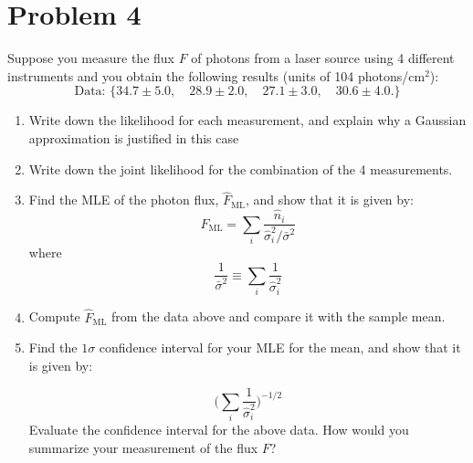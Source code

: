 \documentclass[11pt]{article}
\begin{document}
\section*{Problem 4}
Suppose you measure the flux $F$ of photons from a laser source using 4 different instruments and you obtain the following results (units of 104 photons/cm$^2$):
\begin{equation}
    \text{Data: } \{34.7\pm5.0,\quad 28.9\pm2.0,\quad 27.1\pm3.0,\quad 30.6\pm4.0.\}
\end{equation}
\begin{enumerate}

\item Write down the likelihood for each measurement, and explain why a Gaussian approximation is justified in this case

\item Write down the joint likelihood for the combination of the 4 measurements.

\item Find the MLE of the photon flux, $\hat{F}_{\text{ML}}$, and show that it is given by:
\begin{equation}
    \hat{F}_{\text{ML}} = \sum_{i}\frac{\hat{n}_i}{\hat{\sigma}_i^2/\bar{\sigma}^2}
\end{equation}
where 
\begin{equation}
    \frac{1}{\bar{\sigma}^2}\equiv \sum_{i}\frac{1}{\hat{\sigma}^2_i}
\end{equation}
\item Compute $\hat{F}_{\text{ML}}$ from the data above and compare it with the sample mean.

\item Find the $1\sigma$ confidence interval for your MLE for the mean, and show that it is given by:

\begin{equation}
    \Bigg(\sum_i \frac{1}{\hat{\sigma}^2_i}\Bigg)^{-1/2}
\end{equation}
Evaluate the confidence interval for the above data. How would you summarize your measurement of the flux $F$?

\end{enumerate}

\end{document}
